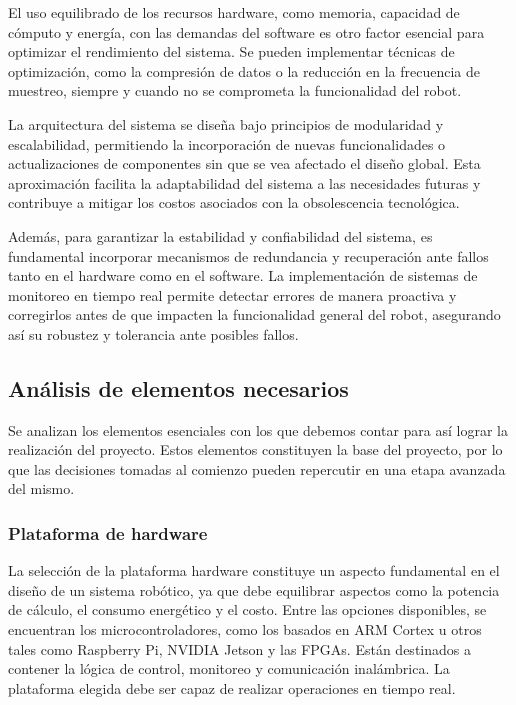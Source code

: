 El uso equilibrado de los recursos hardware, como memoria, capacidad de cómputo y energía, con las demandas del software es otro factor esencial para optimizar el rendimiento del sistema. Se pueden implementar técnicas de optimización, como la compresión de datos o la reducción en la frecuencia de muestreo, siempre y cuando no se comprometa la funcionalidad del robot.

La arquitectura del sistema se diseña bajo principios de modularidad y escalabilidad, permitiendo la incorporación de nuevas funcionalidades o actualizaciones de componentes sin que se vea afectado el diseño global. Esta aproximación facilita la adaptabilidad del sistema a las necesidades futuras y contribuye a mitigar los costos asociados con la obsolescencia tecnológica.

Además, para garantizar la estabilidad y confiabilidad del sistema, es fundamental incorporar mecanismos de redundancia y recuperación ante fallos tanto en el hardware como en el software. La implementación de sistemas de monitoreo en tiempo real permite detectar errores de manera proactiva y corregirlos antes de que impacten la funcionalidad general del robot, asegurando así su robustez y tolerancia ante posibles fallos.


\subsection{Análisis de elementos necesarios}

Se analizan los elementos esenciales con los que debemos contar para así lograr la realización del proyecto. Estos elementos constituyen la base del proyecto, por lo que las decisiones tomadas al comienzo pueden repercutir en una etapa avanzada del mismo.


\subsubsection{Plataforma de hardware}

La selección de la plataforma hardware constituye un aspecto fundamental en el diseño de un sistema robótico, ya que debe equilibrar aspectos como la potencia de cálculo, el consumo energético y el costo. Entre las opciones disponibles, se encuentran los microcontroladores, como los basados en ARM Cortex u otros tales como Raspberry Pi, NVIDIA Jetson y las FPGAs. Están destinados a contener la lógica de control, monitoreo y comunicación inalámbrica. La plataforma elegida debe ser capaz de realizar operaciones en tiempo real.

